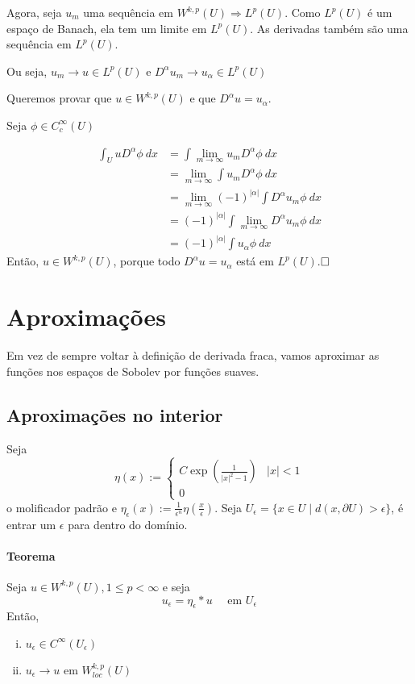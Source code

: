 \documentclass[11pt]{article}
\newcommand{\qed}{$\hfill\square$}
\newcommand{\p}{\partial}
\newcommand{\e}{\epsilon}
\begin{document}
Agora, seja \( u_m \) uma sequência em \( W^{k,p}(U)\Rightarrow L^p(U) \). Como \( L^p(U) \) é um espaço de Banach, ela tem um limite em \( L^p(U) \). As derivadas também são uma sequência em \( L^p(U) \).

Ou seja, \( u_m \rightarrow u \in L^p(U) \) e \( D^\alpha u_m \rightarrow u_{\alpha} \in L^p(U) \)

Queremos provar que \( u \in W^{k,p}(U) \) e que \( D^\alpha u = u_\alpha \).

Seja \( \phi \in C^\infty_c(U) \)

\begin{align*}
	\int_U u D^\alpha \phi\ dx &= \int \lim_{m \rightarrow \infty} u_m D^\alpha \phi \ dx	\\
	&= \lim_{m \rightarrow \infty} \int  u_m D^\alpha \phi \ dx	\\
	&= \lim_{m \rightarrow \infty} (-1)^{|\alpha| }\int D^\alpha  u_m \phi \ dx\\
	&= (-1)^{|\alpha| }\int  \lim_{m \rightarrow \infty} D^\alpha  u_m \phi \ dx		\\
	&= (-1)^{|\alpha| }\int  u_\alpha \phi \ dx
\end{align*}
Então, \( u \in W^{k,p}(U) \), porque todo \( D^\alpha u = u_\alpha \) está em \( L^p(U) \).\qed







\section{Aproximações}

Em vez de sempre voltar à definição de derivada fraca, vamos aproximar as funções nos espaços de Sobolev por funções suaves.

\subsection{Aproximações no interior}

Seja \[ \eta(x):= \begin{cases}
	C \exp\left(\frac{1}{|x|^2-1}\right) & |x|<1\\
	0
\end{cases} \] o molificador padrão e \( \eta_\e(x):= \frac{1}{\e^n}\eta\left(\frac{x}{\e}\right) \). Seja \( U_\e = \{x \in U \mid d(x, \p U) > \e\} \), é entrar um \( \e \) para dentro do domínio.

\paragraph{Teorema} Seja \( u \in W^{k,p}(U), 1 \leq p < \infty \) e seja \[ u_\e = \eta_\e * u\quad  \text{ em } U_\e\] Então, \begin{enumerate}[(i)]
	\item \( u_\e \in C^\infty(U_\e) \)
	\item \( u_\e \rightarrow u \) em \( W^{k,p}_{loc}(U) \)
\end{enumerate}
\end{document}
